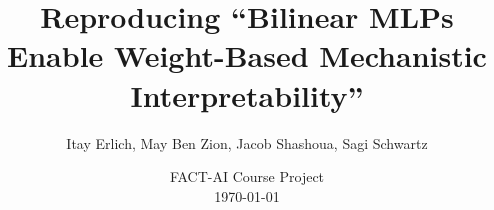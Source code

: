 \documentclass[10pt]{beamer}
\title{Reproducing ``Bilinear MLPs Enable Weight-Based Mechanistic Interpretability''}
\author{Itay Erlich, May Ben Zion, Jacob Shashoua, Sagi Schwartz}
\date{FACT-AI Course Project \\ \today}
\begin{document}
\begin{frame}
    \titlepage
\end{frame}






\appendix

\end{document}
